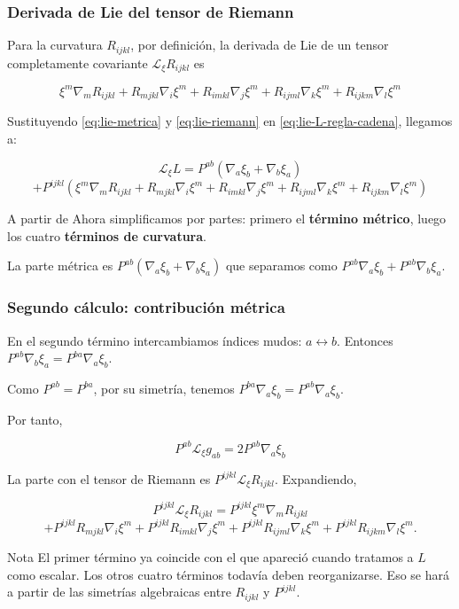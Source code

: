 \documentclass{beamer}
\newcommand{\Eq}[1]{\eqref{#1}}
\newcommand{\DenseDisplaySpacing}{%
\setlength{\abovedisplayskip}{1pt}%
\setlength{\belowdisplayskip}{1pt}%
\setlength{\abovedisplayshortskip}{0pt}%
\setlength{\belowdisplayshortskip}{0pt}%
\setlength{\jot}{1pt}%
}
\begin{document}
\begin{frame}[label=nav-frame-009]
\frametitle{Derivada de Lie del tensor de Riemann}
\small

Para la curvatura $R_{ijkl}$, por definición, la derivada de Lie de un tensor completamente covariante $\mathcal L_\xi R_{ijkl}$ es

\begin{equation}\boxed{
\xi^m\nabla_mR_{ijkl}
+
R_{mjkl}\nabla_i\xi^m
+
R_{imkl}\nabla_j\xi^m
+
R_{ijml}\nabla_k\xi^m
+
R_{ijkm}\nabla_l\xi^m
}
\label{eq:lie-riemann}
\end{equation}

Sustituyendo \Eq{eq:lie-metrica} y \Eq{eq:lie-riemann} en \Eq{eq:lie-L-regla-cadena}, llegamos a:

\[
\mathcal L_\xi L
=
P^{ab}(\nabla_a\xi_b+\nabla_b\xi_a)
\]\[+P^{ijkl}
\left(
\xi^m\nabla_mR_{ijkl}
+
R_{mjkl}\nabla_i\xi^m
+
R_{imkl}\nabla_j\xi^m
+
R_{ijml}\nabla_k\xi^m
+
R_{ijkm}\nabla_l\xi^m
\right)
\]

A partir de Ahora simplificamos por partes: primero el \textbf{término métrico}, luego los cuatro \textbf{términos de curvatura}. \newline

La parte métrica es $P^{ab}(\nabla_a\xi_b+\nabla_b\xi_a)$ que separamos como $P^{ab}\nabla_a\xi_b+P^{ab}\nabla_b\xi_a$.

\end{frame}

\begin{frame}[label=nav-frame-010]
\frametitle{Segundo cálculo: contribución métrica}
\small
\linespread{.94}\selectfont\DenseDisplaySpacing

En el segundo término intercambiamos índices mudos: $a\leftrightarrow b$. Entonces $P^{ab}\nabla_b\xi_a
=P^{ba}\nabla_a\xi_b$. \newline

Como $P^{ab}=P^{ba}$, por su simetría, tenemos $P^{ba}\nabla_a\xi_b = P^{ab}\nabla_a\xi_b$. \newline

Por tanto,

\begin{equation}
\boxed{P^{ab}\mathcal L_\xi g_{ab} = 2P^{ab}\nabla_a\xi_b}
\label{eq:contraccion-P-lie-metrica}
\end{equation}

La parte con el tensor de Riemann es $P^{ijkl}\mathcal L_\xi R_{ijkl}$. Expandiendo,

\[
P^{ijkl}\mathcal L_\xi R_{ijkl}
=
P^{ijkl}\xi^m\nabla_mR_{ijkl}
\]\[
+
P^{ijkl}R_{mjkl}\nabla_i\xi^m
+
P^{ijkl}R_{imkl}\nabla_j\xi^m
+
P^{ijkl}R_{ijml}\nabla_k\xi^m
+
P^{ijkl}R_{ijkm}\nabla_l\xi^m.
\]

\begin{block}{Nota}
El primer término ya coincide con el que apareció cuando tratamos a $L$ como escalar. Los otros cuatro términos todavía deben reorganizarse. Eso se hará a partir de las simetrías algebraicas entre $R_{ijkl}$ y $P^{ijkl}$.
\end{block}

\end{frame}
\end{document}
